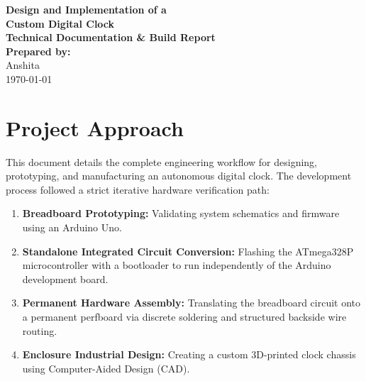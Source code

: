\documentclass[11pt,a4paper]{article}
\begin{document}
\begin{titlepage}
    \centering
    \vspace*{2cm}
    {\Huge \bfseries \color{darkblue} Design and Implementation of a \\ Custom Digital Clock}\\[1.5cm]
    {\large \bfseries Technical Documentation \& Build Report}\\[3cm]
    
    \vfill
    {\large \bfseries Prepared by:}\\[0.2cm]
    {\large Anshita}\\[1cm]
    {\large \today}
\end{titlepage}

\newpage

\tableofcontents
\newpage

\setcounter{page}{1}

\section{Project Approach}
This document details the complete engineering workflow for designing, prototyping, and manufacturing an autonomous digital clock. The development process followed a strict iterative hardware verification path:
\begin{enumerate}
    \item \textbf{Breadboard Prototyping:} Validating system schematics and firmware using an Arduino Uno.
    \item \textbf{Standalone Integrated Circuit Conversion:} Flashing the ATmega328P microcontroller with a bootloader to run independently of the Arduino development board.
    \item \textbf{Permanent Hardware Assembly:} Translating the breadboard circuit onto a permanent perfboard via discrete soldering and structured backside wire routing.
    \item \textbf{Enclosure Industrial Design:} Creating a custom 3D-printed clock chassis using Computer-Aided Design (CAD).
\end{enumerate}
\end{document}
